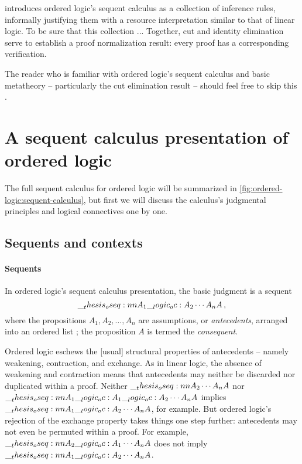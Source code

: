 introduces ordered logic's sequent calculus as a collection of inference rules, informally justifying them with a resource interpretation similar to that of linear logic\autocite{??}.
To be sure that this collection ...
Together, cut and identity elimination ~ serve to establish a proof normalization result: every proof has a corresponding verification.


The reader who is familiar with ordered logic's sequent calculus and basic metatheory -- particularly the cut elimination result -- should feel free to skip this .


\section{A sequent calculus presentation of ordered logic}\label{sec:ordered-logic:sequent-calculus}

The full sequent calculus for ordered logic will be summarized in \cref{fig:ordered-logic:sequent-calculus}, but first we will discuss the calculus's judgmental principles and logical connectives one by one.

\subsection{Sequents and contexts}

\paragraph{Sequents}
In ordered logic's sequent calculus presentation, the basic judgment is a sequent
\begin{equation*}
  \oseq{A_1 \oc A_2 \dotsb A_n |- A} \,,
\end{equation*}
where the propositions $A_1, A_2, \dotsc, A_n$ are assumptions, or \emph{antecedents}, arranged into an ordered list%
; the proposition $A$ is termed the \emph{consequent}.

Ordered logic eschews the [usual] structural properties of antecedents -- namely weakening, contraction, and exchange.
As in linear logic, the absence of weakening and contraction means that
antecedents
may neither be discarded nor duplicated within a proof.
Neither $\oseq{A_2 \dotsb A_n |- A}$ nor $\oseq{A_1 \oc A_1 \oc A_2 \dotsb A_n |- A}$ implies $\oseq{A_1 \oc A_2 \dotsb A_n |- A}$, for example. 
But ordered logic's rejection of the exchange property takes things one step further: antecedents may not even be permuted within a proof.
For example, $\oseq{A_2 \oc A_1 \dotsb A_n |- A}$ does not imply $\oseq{A_1 \oc A_2 \dotsb A_n |- A}$.

